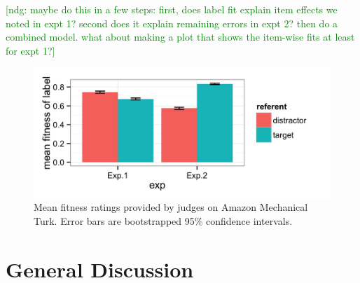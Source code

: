 \documentclass[10pt,letterpaper]{article}
\newcommand{\ndg}[1]{\textcolor{Green}{[ndg: #1]}}
\begin{document}


\ndg{maybe do this in a few steps: first, does label fit explain item effects we noted in expt 1? second does it explain remaining errors in expt 2? then do a combined model. what about making a plot that shows the item-wise fits at least for expt 1?}


\begin{figure}[t!]
\begin{center}
\includegraphics[scale=.18]{images/fitnessInteraction.jpeg}
\caption{Mean fitness ratings provided by judges on Amazon Mechanical Turk. Error bars are bootstrapped 95\% confidence intervals.}
\label{fig:fitnessInteraction}
\end{center}
\end{figure}


\section{General Discussion}
\end{document}
